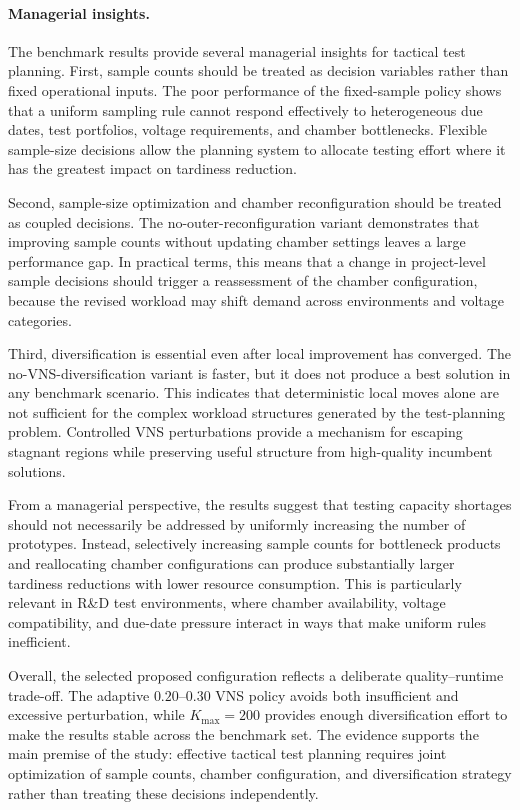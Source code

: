\paragraph{Managerial insights.}

The benchmark results provide several managerial insights for tactical test planning. First, sample counts should be treated as decision variables rather than fixed operational inputs. The poor performance of the fixed-sample policy shows that a uniform sampling rule cannot respond effectively to heterogeneous due dates, test portfolios, voltage requirements, and chamber bottlenecks. Flexible sample-size decisions allow the planning system to allocate testing effort where it has the greatest impact on tardiness reduction.

Second, sample-size optimization and chamber reconfiguration should be treated as coupled decisions. The no-outer-reconfiguration variant demonstrates that improving sample counts without updating chamber settings leaves a large performance gap. In practical terms, this means that a change in project-level sample decisions should trigger a reassessment of the chamber configuration, because the revised workload may shift demand across environments and voltage categories.

Third, diversification is essential even after local improvement has converged. The no-VNS-diversification variant is faster, but it does not produce a best solution in any benchmark scenario. This indicates that deterministic local moves alone are not sufficient for the complex workload structures generated by the test-planning problem. Controlled VNS perturbations provide a mechanism for escaping stagnant regions while preserving useful structure from high-quality incumbent solutions.

From a managerial perspective, the results suggest that testing capacity shortages should not necessarily be addressed by uniformly increasing the number of prototypes. Instead, selectively increasing sample counts for bottleneck products and reallocating chamber configurations can produce substantially larger tardiness reductions with lower resource consumption. This is particularly relevant in R\&D test environments, where chamber availability, voltage compatibility, and due-date pressure interact in ways that make uniform rules inefficient.

Overall, the selected proposed configuration reflects a deliberate quality--runtime trade-off. The adaptive \(0.20\)--\(0.30\) VNS policy avoids both insufficient and excessive perturbation, while \(K_{\max}=200\) provides enough diversification effort to make the results stable across the benchmark set. The evidence supports the main premise of the study: effective tactical test planning requires joint optimization of sample counts, chamber configuration, and diversification strategy rather than treating these decisions independently.
